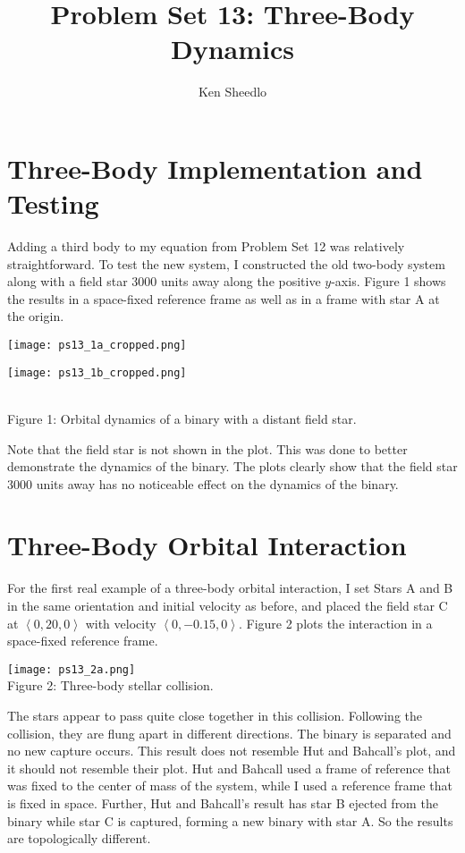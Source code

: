 \documentclass[12pt, letterpaper]{article}
\title{Problem Set 13: Three-Body Dynamics}
\author{Ken Sheedlo}
\begin{document}
\maketitle{}

\section*{Three-Body Implementation and Testing}

Adding a third body to my equation from Problem Set 12 was relatively 
straightforward. To test the new system, I constructed the old two-body system
along with a field star 3000 units away along the positive $y$-axis. Figure 1
shows the results in a space-fixed reference frame as well as in a frame with
star A at the origin.

\begin{center}
\begin{minipage}[t]{0.49\textwidth}
\texttt{[image: ps13\_1a\_cropped.png]}
\end{minipage}
\begin{minipage}[t]{0.49\textwidth}
\texttt{[image: ps13\_1b\_cropped.png]}
\end{minipage}
\\
Figure 1: Orbital dynamics of a binary with a distant field star.
\end{center}

Note that the field star is not shown in the plot. This was done to better 
demonstrate the dynamics of the binary. The plots clearly show that the field
star 3000 units away has no noticeable effect on the dynamics of the binary. 

\section*{Three-Body Orbital Interaction}

For the first real example of a three-body orbital interaction, I set Stars A
and B in the same orientation and initial velocity as before, and placed the
field star C at $\left<0, 20, 0\right>$ with velocity $\left<0, -0.15,
0\right>$. Figure 2 plots the interaction in a space-fixed reference frame.

\begin{center}
\texttt{[image: ps13\_2a.png]}
\\
Figure 2: Three-body stellar collision.
\end{center}

The stars appear to pass quite close together in this collision. Following the
collision, they are flung apart in different directions. The binary is separated
and no new capture occurs. This result does not resemble Hut and Bahcall's plot,
and it should not resemble their plot. Hut and Bahcall used a frame of reference
that was fixed to the center of mass of the system, while I used a reference
frame that is fixed in space. Further, Hut and Bahcall's result has star B
ejected from the binary while star C is captured, forming a new binary with star
A. So the results are topologically different.
\end{document}
